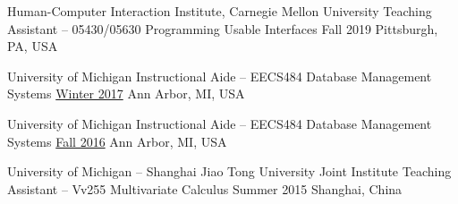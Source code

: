 \begin{cvteachingexps}

  \cvteachingexp
    {Human-Computer Interaction Institute, Carnegie Mellon University} %
    {Teaching Assistant – 05430/05630 Programming Usable Interfaces} %
    {Fall 2019} %
    {Pittsburgh, PA, USA} %
    

  \cvteachingexp
    {University of Michigan} %
    {Instructional Aide – EECS484 Database Management Systems} %
    {\href{http://web.eecs.umich.edu/~mozafari/eecs484/}{Winter 2017}} %
    {Ann Arbor, MI, USA} %
  
  \cvteachingexp
    {University of Michigan} %
    {Instructional Aide – EECS484 Database Management Systems} %
    {\href{http://web.eecs.umich.edu/~aprakash/eecs484/index.html}{Fall 2016}} %
    {Ann Arbor, MI, USA} %

  \cvteachingexp
    {University of Michigan – Shanghai Jiao Tong University Joint Institute} %
    {Teaching Assistant – Vv255 Multivariate Calculus} %
    {Summer 2015} %
    {Shanghai, China} %

\end{cvteachingexps}